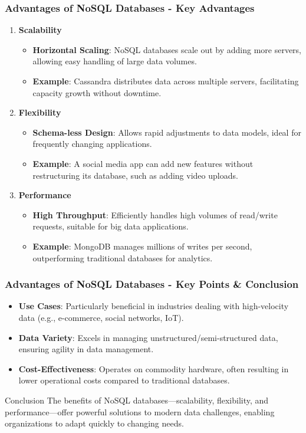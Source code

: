 \documentclass[aspectratio=169]{beamer}
\begin{document}
\begin{frame}[fragile]
    \frametitle{Advantages of NoSQL Databases - Key Advantages}
    \begin{enumerate}
        \item \textbf{Scalability}
            \begin{itemize}
                \item \textbf{Horizontal Scaling}: NoSQL databases scale out by adding more servers, allowing easy handling of large data volumes. 
                \item \textbf{Example}: Cassandra distributes data across multiple servers, facilitating capacity growth without downtime.
            \end{itemize}
        \item \textbf{Flexibility}
            \begin{itemize}
                \item \textbf{Schema-less Design}: Allows rapid adjustments to data models, ideal for frequently changing applications.
                \item \textbf{Example}: A social media app can add new features without restructuring its database, such as adding video uploads.
            \end{itemize}
        \item \textbf{Performance}
            \begin{itemize}
                \item \textbf{High Throughput}: Efficiently handles high volumes of read/write requests, suitable for big data applications.
                \item \textbf{Example}: MongoDB manages millions of writes per second, outperforming traditional databases for analytics.
            \end{itemize}
    \end{enumerate}
\end{frame}

\begin{frame}[fragile]
    \frametitle{Advantages of NoSQL Databases - Key Points & Conclusion}
    \begin{itemize}
        \item \textbf{Use Cases}: Particularly beneficial in industries dealing with high-velocity data (e.g., e-commerce, social networks, IoT).
        \item \textbf{Data Variety}: Excels in managing unstructured/semi-structured data, ensuring agility in data management.
        \item \textbf{Cost-Effectiveness}: Operates on commodity hardware, often resulting in lower operational costs compared to traditional databases.
    \end{itemize}
    
    \begin{block}{Conclusion}
        The benefits of NoSQL databases—scalability, flexibility, and performance—offer powerful solutions to modern data challenges, enabling organizations to adapt quickly to changing needs.
    \end{block}
\end{frame}
\end{document}
